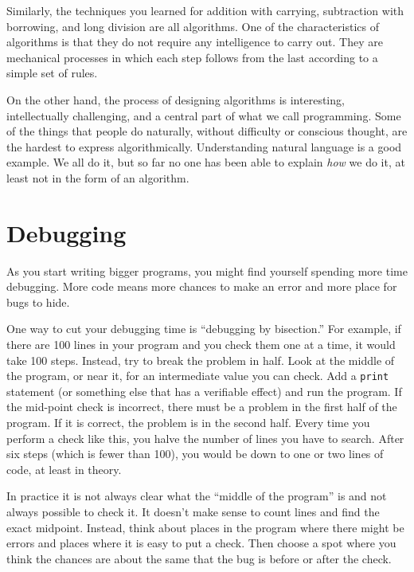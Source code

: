 
Similarly, the techniques you learned for addition with carrying,
subtraction with borrowing, and long division are all algorithms.  One
of the characteristics of algorithms is that they do not require any
intelligence to carry out.  They are mechanical processes in which
each step follows from the last according to a simple set of rules.

On the other hand, the process of designing algorithms is interesting,
intellectually challenging, and a central part of what we call
programming.
%
Some of the things that people do naturally, without difficulty or
conscious thought, are the hardest to express algorithmically.
Understanding natural language is a good example.  We all do it, but
so far no one has been able to explain {\em how} we do it, at least
not in the form of an algorithm.


\section{Debugging}

As you start writing bigger programs, you might find yourself
spending more time debugging.  More code means more chances to
make an error and more place for bugs to hide.
%

One way to cut your debugging time is ``debugging by bisection.''
For example, if there are 100 lines in your program and you
check them one at a time, it would take 100 steps.
%
Instead, try to break the problem in half.  Look at the middle
of the program, or near it, for an intermediate value you
can check.  Add a {\tt print} statement (or something else
that has a verifiable effect) and run the program.
%
If the mid-point check is incorrect, there must be a problem in the
first half of the program.  If it is correct, the problem is
in the second half.
%
Every time you perform a check like this, you halve the number of
lines you have to search.  After six steps (which is fewer than 100),
you would be down to one or two lines of code, at least in theory.

In practice it is not always clear what
the ``middle of the program'' is and not always possible to
check it.  It doesn't make sense to count lines and find the
exact midpoint.  Instead, think about places
in the program where there might be errors and places where it
is easy to put a check.  Then choose a spot where you
think the chances are about the same that the bug is before
or after the check.




